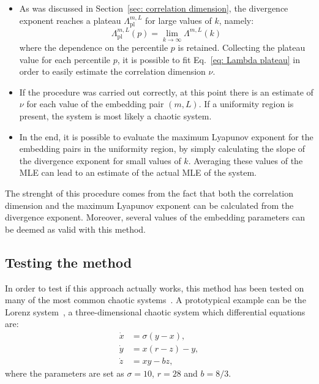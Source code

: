\begin{itemize}
\item
As was discussed in Section~\ref{sec: correlation dimension}, the divergence exponent reaches a plateau
$\Lambda_{\text{pl}}^{m,L}$ for large values of $k$, namely:
\begin{equation}
    \label{eq: Lambda plateau k infinity}
    \Lambda_{\text{pl}}^{m,L}(p) = \lim_{k\rightarrow \infty}\Lambda^{m,L}(k)
\end{equation}
where the dependence on the percentile $p$ is retained.
Collecting the plateau value for each percentile $p$, it is possible to fit Eq.~\ref{eq: Lambda plateau}
in order to easily estimate the correlation dimension $\nu$.


\item
If the procedure was carried out correctly, at this point there is an estimate of $\nu$ for each
value of the embedding pair $(m,L)$. If a uniformity region is present, the system is most likely
a chaotic system.


\item
In the end, it is possible to evaluate the
maximum Lyapunov exponent for the embedding pairs in the uniformity region, by simply calculating
the slope of the divergence exponent for small values of $k$. Averaging these values of the MLE
can lead to an estimate of the actual MLE of the system.

\end{itemize}

The strenght of this procedure comes from the fact that both the correlation dimension and the
maximum Lyapunov exponent can be calculated from the divergence exponent. Moreover, several
values of the embedding parameters can be deemed as valid with this method.


\subsection{Testing the method}\label{subsec: testing the procedure}

In order to test if this approach actually works, this method has been tested on many of the most
common chaotic systems~\cite{ref:perinelli2020chasing}. 
A prototypical example can be the Lorenz system~\cite{lorenz1963deterministic}, a three-dimensional
chaotic system which differential equations are:
\begin{equation}
\label{eq: Lorenz system}
\begin{aligned}
    \dot{x}&=\sigma(y-x),\\
    \dot{y}&=x(r-z)-y,\\
    \dot{z}&=xy-bz,
\end{aligned}
\end{equation}
where the parameters are set as $\sigma=10$, $r=28$ and $b=8/3$.

